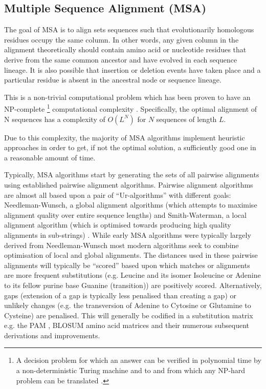 \subsection{Multiple Sequence Alignment (MSA)}

The goal of MSA is to align sets sequences such that 
evolutionarily homologous residues occupy the same column. In other words,
any given column in the alignment theoretically should contain amino acid or nucleotide residues
that derive from the same common ancestor and have evolved in each sequence lineage.
It is also possible that insertion or deletion events have taken place
and a particular residue is absent in the ancestral node or sequence lineage.

This is a non-trivial computational problem which has been proven to have an NP-complete
\footnote{A decision problem for which an answer can be verified in polynomial time 
    by a non-deterministic Turing machine and to and from which any NP-hard problem
    can be translated \citep{Karp1972}.} computational complexity \citep{Wang1994}.
Specifically, the optimal alignment of N sequences has a complexity of \(O(L^{N})\)
for \(N\) sequences of length \( L \)\citep{Sievers2011}.

Due to this complexity, the majority of MSA algorithms implement heuristic approaches
in order to get, if not the optimal solution, a sufficiently good one in a reasonable
amount of time. 

Typically, MSA algorithms start by generating the sets of all pairwise alignments
using established pairwise alignment algorithms.
Pairwise alignment algorithms are almost all based upon a
pair of ``Ur-algorithms'' with different goals: 
Needleman-Wunsch, a global alignment algorithms (which attempts to maximise 
alignment quality over entire sequence lengths) \citep{Needleman1970} and Smith-Waterman, 
a local alignment algorithm (which is optimised towards producing high quality alignments
in sub-strings) \citep{Smith1981}.  While early MSA algorithms were typically
largely derived from Needleman-Wunsch most modern algorithms seek to combine 
optimisation of local and global alignments.  The distances used in these
pairwise alignments will typically be ``scored'' based upon which matches or 
alignments are more frequent substitutions (e.g. Leucine and its isomer Isoleucine 
or Adenine to its fellow purine base Guanine (transition)) 
are positively scored.   Alternatively, gaps 
(extension of a gap is typically less penalised than creating a gap) or unlikely changes (e.g. the transversion
of Adenine to Cytosine or Glutamine to Cysteine) are penalised.
This will generally be codified in a substitution matrix e.g. the PAM \citep{Dayhoff1978}, 
BLOSUM \citep{Henikoff1992} amino acid matrices and their numerous subsequent
derivations and improvements. 


